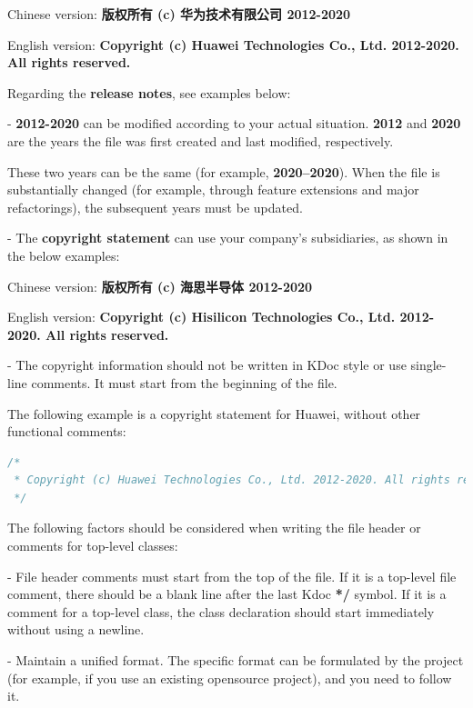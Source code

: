 {{{{{{{{{{{{{{{{Chinese version: \textbf{版权所有 (c) 华为技术有限公司 2012-2020} \

English version: \textbf{Copyright (c) Huawei Technologies Co., Ltd. 2012-2020. All rights reserved.}



Regarding the \textbf{release notes}, see examples below:



- \textbf{2012-2020} can be modified according to your actual situation. \textbf{2012} and \textbf{2020} are the years the file was first created and last modified, respectively.

These two years can be the same (for example, \textbf{2020–2020}). When the file is substantially changed (for example, through feature extensions and major refactorings), the subsequent years must be updated.



- The \textbf{copyright statement} can use your company's subsidiaries, as shown in the below examples: \

Chinese version: \textbf{版权所有 (c) 海思半导体 2012-2020} \

English version: \textbf{Copyright (c) Hisilicon Technologies Co., Ltd. 2012-2020. All rights reserved.} 



- The copyright information should not be written in KDoc style or use single-line comments. It must start from the beginning of the file.

The following example is a copyright statement for Huawei, without other functional comments:



\begin{lstlisting}[language=Kotlin]
/*
 * Copyright (c) Huawei Technologies Co., Ltd. 2012-2020. All rights reserved.
 */
\end{lstlisting}


The following factors should be considered when writing the file header or comments for top-level classes:

- File header comments must start from the top of the file. If it is a top-level file comment, there should be a blank line after the last Kdoc \textbf{*/} symbol. If it is a comment for a top-level class, the class declaration should start immediately without using a newline.

- Maintain a unified format. The specific format can be formulated by the project (for example, if you use an existing opensource project), and you need to follow it.

}}}}}}}}}}}}}}}}

